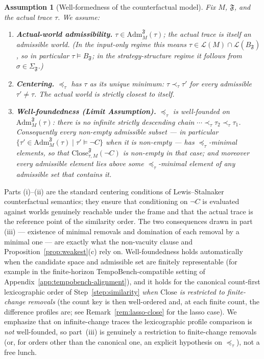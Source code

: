 \documentclass[11pt]{article}
\newtheorem{assumption}{Assumption}
\theoremstyle{remark}
\newcommand{\Close}{\mathrm{Close}}
\newcommand{\Lang}{\mathcal{L}}
\newcommand{\Frame}{\mathfrak{F}}
\newcommand{\Adm}{\mathrm{Adm}}
\begin{document}
\begin{assumption}[Well-formedness of the counterfactual model]
\label{ass:wf}
Fix \(M\), \(\Frame\), and the actual trace \(\tau\). We assume:
\begin{enumerate}[label=(\roman*)]
  \item \textbf{Actual-world admissibility.}
        \(\tau\in\Adm_M^{\Frame}(\tau)\); the actual trace is itself an
        admissible world. (In the input-only regime this means
        \(\tau\in\Lang(M)\cap\Lang(B_{\Frame})\), so in particular
        \(\tau\models B_{\Frame}\); in the strategy-structure regime it follows
        from \(\sigma\in\Sigma_{\Frame}\).)
  \item \textbf{Centering.} \(\preceq_\tau\) has \(\tau\) as its unique minimum:
        \(\tau\prec_\tau\tau'\) for every admissible \(\tau'\neq\tau\). The
        actual world is strictly closest to itself.
  \item \textbf{Well-foundedness (Limit Assumption).} \(\preceq_\tau\) is
        well-founded on \(\Adm_M^{\Frame}(\tau)\): there is no infinite strictly
        descending chain \(\cdots\prec_\tau\tau_2\prec_\tau\tau_1\).
        Consequently every non-empty admissible subset --- in particular
        \(\{\tau'\in\Adm_M^{\Frame}(\tau)\mid\tau'\models\neg C\}\) when it is
        non-empty --- has \(\preceq_\tau\)-minimal elements, so that
        \(\Close_{\tau,M}^{\Frame}(\neg C)\) is non-empty in that case; and
        moreover every admissible element lies above some \(\preceq_\tau\)-minimal
        element of any admissible set that contains it.
\end{enumerate}
\end{assumption}

Parts (i)--(ii) are the standard centering conditions of Lewis--Stalnaker
counterfactual semantics; they ensure that conditioning on \(\neg C\) is
evaluated against worlds genuinely reachable under the frame and that the actual
trace is the reference point of the similarity order. The two consequences drawn
in part (iii) --- existence of minimal removals and domination of each removal by
a minimal one --- are exactly what the non-vacuity clause and
Proposition~\ref{prop:weakest}(c) rely on. Well-foundedness holds automatically
when the candidate space and admissible set are finitely representable (for
example in the finite-horizon TempoBench-compatible setting of
Appendix~\ref{app:tempobench-alignment}), and it holds for the canonical
count-first lexicographic order of Step~\ref{step:similarity} \emph{when
\(\Close\) is restricted to finite-change removals} (the count key is then
well-ordered and, at each finite count, the difference profiles are; see
Remark~\ref{rem:lasso-close} for the lasso case). We emphasize that on
infinite-change traces the lexicographic profile comparison is \emph{not}
well-founded, so part~(iii) is genuinely a restriction to finite-change removals
(or, for orders other than the canonical one, an explicit hypothesis on
\(\preceq_\tau\)), not a free lunch.
\end{document}
